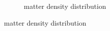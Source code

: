 \begin{figure}[hbtp]
\begin{subfigure}{0.70\textwidth}
        \caption{\oEight\ matter density distribution}
        \label{DOMFitData_o18_matterDensity}
    \end{subfigure}
\end{figure}

